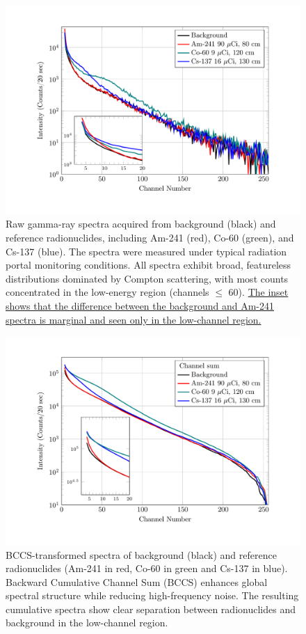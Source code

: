 \documentclass[10pt]{wlscirep}
\begin{document}
\begin{figure}[ht]
\centering
\includegraphics[width=\linewidth]{figure/fig01_bkgref.pdf}
\caption{Raw gamma-ray spectra acquired from background (black) and reference radionuclides, including Am-241 (red), Co-60 (green), and Cs-137 (blue). The spectra were measured under typical radiation portal monitoring conditions. All spectra exhibit broad, featureless distributions dominated by Compton scattering, with most counts concentrated in the low-energy region (channels $\le$ 60). \ul{The inset shows that the difference between the background and Am-241 spectra is marginal and seen only in the low-channel region.}}
\label{fig:bkgref}
\end{figure}

\begin{figure}[ht]
\centering
\includegraphics[width=\linewidth]{figure/fig02_channelsum.pdf}
\caption{BCCS-transformed spectra of background (black) and reference radionuclides (Am-241 in red, Co-60 in green and Cs-137 in blue). Backward Cumulative Channel Sum (BCCS) enhances global spectral structure while reducing high-frequency noise. The resulting cumulative spectra show clear separation between radionuclides and background in the low-channel region.}
\label{fig:channelsum}
\end{figure}
\end{document}
